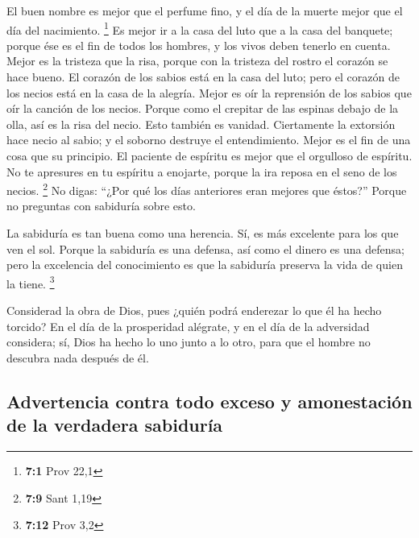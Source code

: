 \begin{paracol}{2}
 El buen nombre es mejor que el perfume fino, y el día de
la muerte mejor que el día del nacimiento. \footnote{\textbf{7:1} Prov
  22,1}  Es mejor ir a la casa del luto que a la casa del
banquete; porque ése es el fin de todos los hombres, y los vivos deben
tenerlo en cuenta.  Mejor es la tristeza que la risa,
porque con la tristeza del rostro el corazón se hace bueno.
 El corazón de los sabios está en la casa del luto; pero
el corazón de los necios está en la casa de la alegría. 
Mejor es oír la reprensión de los sabios que oír la canción de los
necios.  Porque como el crepitar de las espinas debajo de
la olla, así es la risa del necio. Esto también es vanidad.
 Ciertamente la extorsión hace necio al sabio; y el
soborno destruye el entendimiento.  Mejor es el fin de una
cosa que su principio. El paciente de espíritu es mejor que el orgulloso
de espíritu.  No te apresures en tu espíritu a enojarte,
porque la ira reposa en el seno de los necios. \footnote{\textbf{7:9}
  Sant 1,19}  No digas: ``¿Por qué los días anteriores
eran mejores que éstos?'' Porque no preguntas con sabiduría sobre esto.

 La sabiduría es tan buena como una herencia. Sí, es más
excelente para los que ven el sol.  Porque la sabiduría
es una defensa, así como el dinero es una defensa; pero la excelencia
del conocimiento es que la sabiduría preserva la vida de quien la tiene.
\footnote{\textbf{7:12} Prov 3,2}

 Considerad la obra de Dios, pues ¿quién podrá enderezar
lo que él ha hecho torcido?  En el día de la prosperidad
alégrate, y en el día de la adversidad considera; sí, Dios ha hecho lo
uno junto a lo otro, para que el hombre no descubra nada después de él.

\hypertarget{advertencia-contra-todo-exceso-y-amonestaciuxf3n-de-la-verdadera-sabiduruxeda}{%
\subsection{Advertencia contra todo exceso y amonestación de la
verdadera
sabiduría}\label{advertencia-contra-todo-exceso-y-amonestaciuxf3n-de-la-verdadera-sabiduruxeda}}


\end{paracol}
